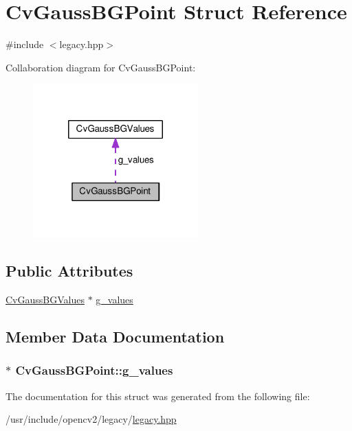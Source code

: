 \hypertarget{structCvGaussBGPoint}{\section{Cv\-Gauss\-B\-G\-Point Struct Reference}
\label{structCvGaussBGPoint}
}


{\ttfamily \#include $<$legacy.\-hpp$>$}



Collaboration diagram for Cv\-Gauss\-B\-G\-Point\-:\nopagebreak
\begin{figure}[H]
\begin{center}
\leavevmode
\includegraphics[width=180pt]{structCvGaussBGPoint__coll__graph}
\end{center}
\end{figure}
\subsection*{Public Attributes}
\begin{DoxyCompactItemize}
\item 
\hyperlink{structCvGaussBGValues}{Cv\-Gauss\-B\-G\-Values} $\ast$ \hyperlink{structCvGaussBGPoint_a132738ec9fb8ee56a2dabf6075d190b3}{g\-\_\-values}
\end{DoxyCompactItemize}


\subsection{Member Data Documentation}
\hypertarget{structCvGaussBGPoint_a132738ec9fb8ee56a2dabf6075d190b3}{
\subsubsection[{g\-\_\-values}]{$\ast$ Cv\-Gauss\-B\-G\-Point\-::g\-\_\-values}}\label{structCvGaussBGPoint_a132738ec9fb8ee56a2dabf6075d190b3}


The documentation for this struct was generated from the following file\-:\begin{DoxyCompactItemize}
\item 
/usr/include/opencv2/legacy/\hyperlink{legacy_8hpp}{legacy.\-hpp}\end{DoxyCompactItemize}
